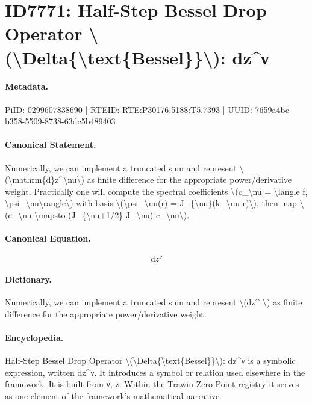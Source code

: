 \section*{ID7771: Half-Step Bessel Drop Operator \textbackslash{}(\textbackslash{}Delta\{\textbackslash{}text\{Bessel\}\}\textbackslash{}): dz\textasciicircum{}ν}
\paragraph{Metadata.}
PiID: 0299607838690 | RTEID: RTE:P30176.5188:T5.7393 | UUID: 7659a4bc-b358-5509-8738-63dc5b489403

\paragraph{Canonical Statement.}
Numerically, we can implement a truncated sum and represent \textbackslash{}(\textbackslash{}mathrm\{d\}z\textasciicircum{}\textbackslash{}nu\textbackslash{}) as finite difference for the appropriate power/derivative weight. Practically one will compute the spectral coefficients \textbackslash{}(c\_\textbackslash{}nu = \textbackslash{}langle f, \textbackslash{}psi\_\textbackslash{}nu\textbackslash{}rangle\textbackslash{}) with basis \textbackslash{}(\textbackslash{}psi\_\textbackslash{}nu(r) = J\_\{\textbackslash{}nu\}(k\_\textbackslash{}nu r)\textbackslash{}), then map \textbackslash{}(c\_\textbackslash{}nu \textbackslash{}mapsto (J\_\{\textbackslash{}nu+1/2\}-J\_\textbackslash{}nu) c\_\textbackslash{}nu\textbackslash{}).

\paragraph{Canonical Equation.}
\[
\mathrm{d}z^\nu
\]

\paragraph{Dictionary.}
Numerically, we can implement a truncated sum and represent \textbackslash{}(dz\textasciicircum{} \textbackslash{}) as finite difference for the appropriate power/derivative weight.

\paragraph{Encyclopedia.}
Half-Step Bessel Drop Operator \textbackslash{}(\textbackslash{}Delta\{\textbackslash{}text\{Bessel\}\}\textbackslash{}): dz\textasciicircum{}ν is a symbolic expression, written dz\textasciicircum{}ν. It introduces a symbol or relation used elsewhere in the framework. It is built from ν, z. Within the Trawin Zero Point registry it serves as one element of the framework's mathematical narrative.
